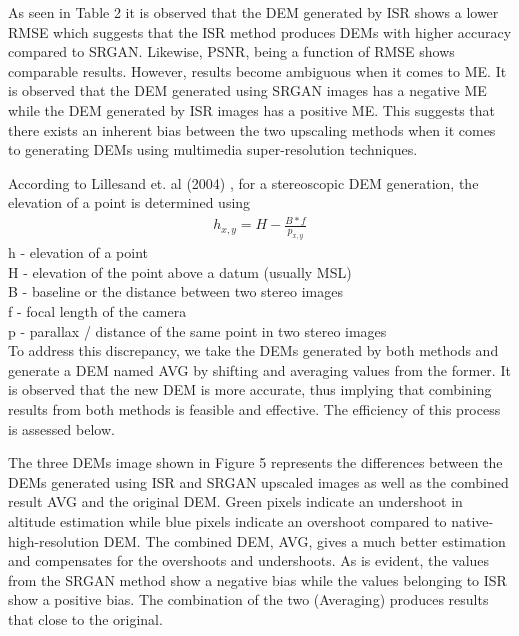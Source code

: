\documentclass[conference]{IEEEtran}
\begin{document}
As seen in Table 2 it is observed that the DEM generated by
ISR shows a lower RMSE which suggests that the ISR
method produces DEMs with higher accuracy compared to
SRGAN. Likewise, PSNR, being a function of RMSE
shows comparable results. However, results become
ambiguous when it comes to ME. It is observed that the
DEM generated using SRGAN images has a negative ME
while the DEM generated by ISR images has a positive ME.
This suggests that there exists an inherent bias between the
two upscaling methods when it comes to generating DEMs
using multimedia super-resolution techniques.

According to Lillesand et. al (2004) \cite{lillesand}, for a stereoscopic
DEM generation, the elevation of a point is determined
using \\

\begin{align}
    h_{x,y}= H - \frac{B*f}{p_{x,y}}
\end{align}
h - elevation of a point \\
H - elevation of the point above a datum (usually MSL) \\
B - baseline or the distance between two stereo images \\
f - focal length of the camera \\
p - parallax / distance of the same point in two stereo images \\



To address this discrepancy, we take the DEMs generated
by both methods and generate a DEM named AVG by
shifting and averaging values from the former. It is observed
that the new DEM is more accurate, thus implying that
combining results from both methods is feasible and
effective. The efficiency of this process is assessed below.



The three DEMs image shown in Figure 5 represents the
differences between the DEMs generated using ISR and
SRGAN upscaled images as well as the combined result
AVG and the original DEM. Green pixels indicate an
undershoot in altitude estimation while blue pixels indicate
an overshoot compared to native-high-resolution DEM. The
combined DEM, AVG, gives a much better estimation and
compensates for the overshoots and undershoots. As is
evident, the values from the SRGAN method show a
negative bias while the values belonging to ISR show a
positive bias. The combination of the two (Averaging)
produces results that close to the original. 
\end{document}

